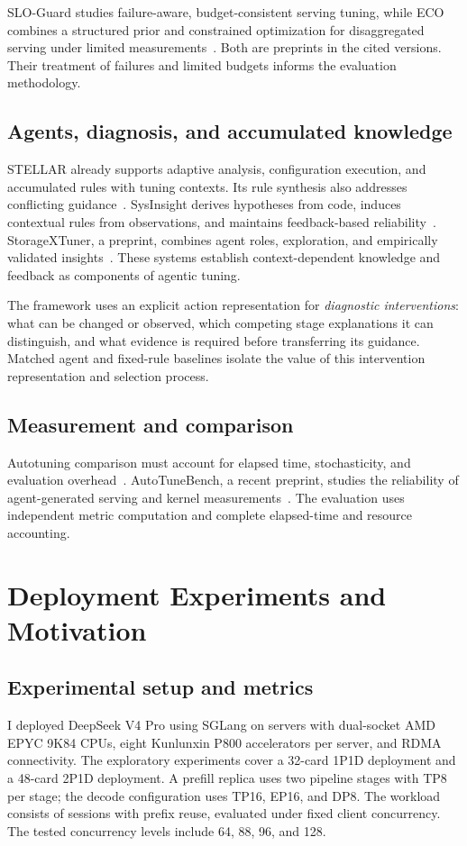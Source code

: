 \documentclass[11pt,a4paper]{article}
\begin{document}
SLO-Guard studies failure-aware, budget-consistent serving tuning, while ECO combines a structured prior and constrained optimization for disaggregated serving under limited measurements~\cite{sloguard2026,ecotuning2026}. Both are preprints in the cited versions. Their treatment of failures and limited budgets informs the evaluation methodology.

\subsection{Agents, diagnosis, and accumulated knowledge}
STELLAR already supports adaptive analysis, configuration execution, and accumulated rules with tuning contexts. Its rule synthesis also addresses conflicting guidance~\cite{stellar2025}. SysInsight derives hypotheses from code, induces contextual rules from observations, and maintains feedback-based reliability~\cite{sysinsight2026}. StorageXTuner, a preprint, combines agent roles, exploration, and empirically validated insights~\cite{storagextuner2025}. These systems establish context-dependent knowledge and feedback as components of agentic tuning.

The framework uses an explicit action representation for \emph{diagnostic interventions}: what can be changed or observed, which competing stage explanations it can distinguish, and what evidence is required before transferring its guidance. Matched agent and fixed-rule baselines isolate the value of this intervention representation and selection process.

\subsection{Measurement and comparison}
Autotuning comparison must account for elapsed time, stochasticity, and evaluation overhead~\cite{methodology2024}. AutoTuneBench, a recent preprint, studies the reliability of agent-generated serving and kernel measurements~\cite{autotunebench2026}. The evaluation uses independent metric computation and complete elapsed-time and resource accounting.

\section{Deployment Experiments and Motivation}
\label{sec:historical}
\subsection{Experimental setup and metrics}
I deployed DeepSeek V4 Pro using SGLang on servers with dual-socket AMD EPYC 9K84 CPUs, eight Kunlunxin P800 accelerators per server, and RDMA connectivity. The exploratory experiments cover a 32-card 1P1D deployment and a 48-card 2P1D deployment. A prefill replica uses two pipeline stages with TP8 per stage; the decode configuration uses TP16, EP16, and DP8. The workload consists of sessions with prefix reuse, evaluated under fixed client concurrency. The tested concurrency levels include 64, 88, 96, and 128.
\end{document}
